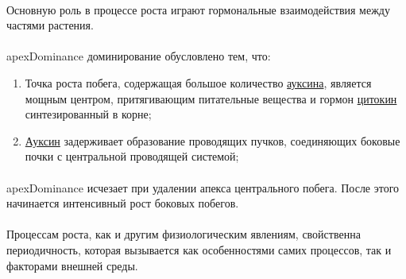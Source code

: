 \paragraph*{}Основную роль в процессе роста играют гормональные взаимодействия между частями растения. 


\paragraph*{}\gls{apexDominance} доминирование обусловлено тем, что:

\begin{enumerate}
	\item Точка роста побега, содержащая большое количество \hyperlink{auxsin}{ауксина}, является мощным центром, притягивающим питательные вещества и гормон \hyperlink{citokin}{цитокин} синтезированный в корне;
	\item \hyperlink{auxsin}{Ауксин} задерживает образование проводящих пучков, соединяющих боковые почки с центральной проводящей системой;
\end{enumerate}

\paragraph*{}\gls{apexDominance} исчезает при удалении апекса центрального побега. После этого начинается интенсивный рост боковых побегов.



\paragraph*{}Процессам роста, как и другим физиологическим явлениям, свойственна периодичность, которая вызывается как особенностями самих процессов, так и факторами внешней среды. 

